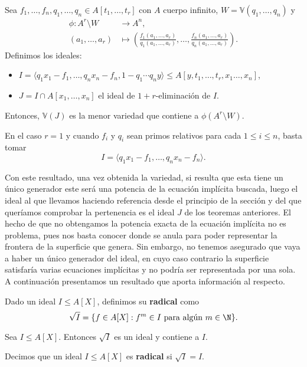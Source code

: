 \begin{teorema}\label{t:implicitRac}
    Sea $f_1,\dots, f_n, q_1,\dots, q_n \in A[t_1, \dots, t_r]$ con $A$ cuerpo infinito, $W=\mathbb{V}(q_1,\dots, q_n)$ y
    \begin{align*}
        \phi \colon A^r\setminus W  & \to A^n,\\
        (a_1,\dots, a_r) & \mapsto \left( \frac{f_1(a_1,\dots, a_r)}{q_1(a_1,\dots, a_r)}, \dots, \frac{f_n(a_1,\dots, a_r)}{q_n(a_1,\dots, a_r)}\right).
    \end{align*}
     Definimos los ideales:
    \begin{itemize}
        \item $I = \langle q_1x_1-f_1,\dots,  q_nx_n-f_n, 1-q_1\cdots q_ny\rangle \le A[y,t_1,\dots, t_r,x_1\dots, x_n]$,
        \item $J = I\cap A[x_1,\dots, x_n]$ el ideal de $1+r$-eliminación de $I$.
    \end{itemize}
    Entonces, $\mathbb{V}(J)$ es la menor variedad que contiene a $\phi(A^r\setminus W)$.
\end{teorema}

\begin{observacion}
    En el caso $r=1$ y cuando $f_i$ y $q_i$ sean primos relativos para cada $1\le i \le n$, basta tomar
    $$I = \langle q_1x_1-f_1,\dots,  q_nx_n-f_n\rangle.$$
\end{observacion}

Con este resultado, una vez obtenida la variedad, si resulta que esta tiene un único generador este será una potencia de la ecuación implícita buscada, luego el ideal al que llevamos haciendo referencia desde el principio de la sección y del que queríamos comprobar la pertenencia es el ideal $J$ de los teoremas anteriores. El hecho de que no obtengamos la potencia exacta de la ecuación implícita no es problema, pues nos basta conocer donde se anula para poder representar la frontera de la superficie que genera. Sin embargo, no tenemos asegurado que vaya a haber un único generador del ideal, en cuyo caso contrario la superficie satisfaría varias ecuaciones implícitas y no podría ser representada por una sola. A continuación presentamos un resultado que aporta información al respecto.

\begin{definicion}
    Dado un ideal $I\le A[X]$, definimos su \textbf{radical} como
    \begin{equation*}
        \sqrt{I} = \{f\in A[X] : f^m\in I \text{ para algún } m\in \N\}.
    \end{equation*}
\end{definicion}
\begin{proposicion}
    Sea $I\le A[X]$. Entonces $\sqrt{I}$ es un ideal y contiene a $I$.
\end{proposicion}
\begin{definicion}
    Decimos que un ideal $I\le A[X]$ es \textbf{radical} si $\sqrt{I} = I$.
\end{definicion}


